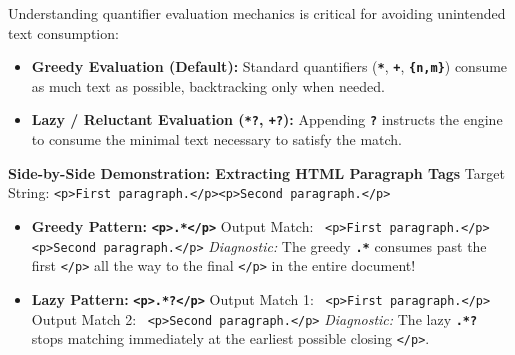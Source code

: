 \documentclass[10pt,a4paper]{article}
\newcommand{\rx}[1]{\texttt{\bfseries\color{inlinecode}#1}}
\newcommand{\cmark}{\textcolor{accentgreen}{\textbf{\checkmark}}}
\begin{document}
\vspace{-2pt}
\par\vspace{1pt}
Understanding quantifier evaluation mechanics is critical for avoiding unintended text consumption:

\begin{itemize}[leftmargin=12pt, itemsep=0.5pt, parsep=0pt, topsep=0.5pt]
    \item \textbf{Greedy Evaluation (Default):} Standard quantifiers (\rx{*}, \rx{+}, \rx{\{n,m\}}) consume as much text as possible, backtracking only when needed.
    \item \textbf{Lazy / Reluctant Evaluation (\rx{*?}, \rx{+?}):} Appending \rx{?} instructs the engine to consume the minimal text necessary to satisfy the match.
\end{itemize}

\vspace{-2pt}
\begin{examplebox}
\footnotesize
\textbf{Side-by-Side Demonstration: Extracting HTML Paragraph Tags}
\newline Target String: \texttt{<p>First paragraph.</p><p>Second paragraph.</p>}
\begin{itemize}[leftmargin=12pt, itemsep=2pt, parsep=0pt, topsep=1pt]
    \item \textbf{Greedy Pattern:} \rx{<p>.*</p>}
    \newline Output Match: \cmark\ \texttt{<p>First paragraph.</p><p>Second paragraph.</p>}
    \newline \textit{Diagnostic:} The greedy \rx{.*} consumes past the first \texttt{</p>} all the way to the final \texttt{</p>} in the entire document!
    \item \textbf{Lazy Pattern:} \rx{<p>.*?</p>}
    \newline Output Match 1: \cmark\ \texttt{<p>First paragraph.</p>} \qquad Output Match 2: \cmark\ \texttt{<p>Second paragraph.</p>}
    \newline \textit{Diagnostic:} The lazy \rx{.*?} stops matching immediately at the earliest possible closing \texttt{</p>}.
\end{itemize}
\end{examplebox}

\newpage

\end{document}
